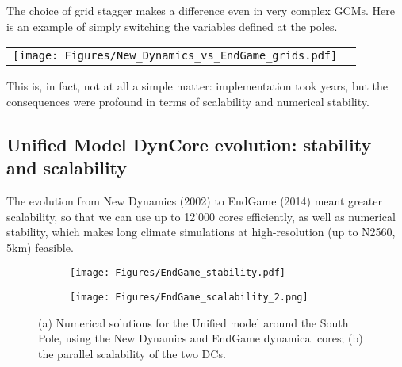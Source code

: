 The choice of grid stagger makes a difference even in very complex GCMs. Here is an example of simply switching the variables defined at the poles.

\begin{tabular}{cc}
	\centering
	\texttt{[image: Figures/New\_Dynamics\_vs\_EndGame\_grids.pdf]}
\end{tabular}

This is, in fact, not at all a simple matter: implementation took years, but the consequences were profound in terms of scalability and numerical stability.

\subsection{Unified Model DynCore evolution: stability and scalability} 

The evolution from New Dynamics (2002) to EndGame (2014) meant greater scalability, so that we can use up to 12'000 cores efficiently, as well as numerical stability, which makes long climate simulations at high-resolution (up to N2560, 5km) feasible.

\begin{figure}[h!]
	\centering
	\begin{subfigure}[b]{0.9\textwidth}
		\texttt{[image: Figures/EndGame\_stability.pdf]}
		\caption{}
		\label{fig:UM-Instabilities} 
	\end{subfigure}
	\begin{subfigure}[b]{0.9\textwidth}
		\texttt{[image: Figures/EndGame\_scalability\_2.png]}
		\caption{}
		\label{fig:UM-scalablity}
	\end{subfigure}
	\caption{(a) Numerical solutions for the Unified model around the South Pole, using the New Dynamics and EndGame dynamical cores; (b) the parallel scalability of the two DCs.}
\end{figure}
